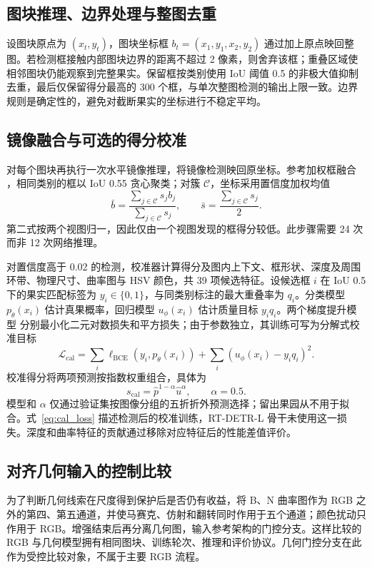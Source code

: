\documentclass[11pt,a4paper]{ctexart}
\begin{document}
\subsection{图块推理、边界处理与整图去重}
设图块原点为 $(x_t,y_t)$，图块坐标框 $b_t=(x_1,y_1,x_2,y_2)$ 通过加上原点映回整图。若检测框接触内部图块边界的距离不超过 2 像素，则舍弃该框；重叠区域使相邻图块仍能观察到完整果实。保留框按类别使用 IoU 阈值 0.5 的非极大值抑制去重，最后仅保留得分最高的 300 个框，与单次整图检测的输出上限一致。边界规则是确定性的，避免对截断果实的坐标进行不稳定平均。

\subsection{镜像融合与可选的得分校准}
对每个图块再执行一次水平镜像推理，将镜像检测映回原坐标。参考加权框融合 \cite{wbf}，相同类别的框以 IoU 0.55 贪心聚类；对簇 $\mathcal{C}$，坐标采用置信度加权均值
\begin{equation}
\bar b=\frac{\sum_{j\in\mathcal{C}}s_j b_j}{\sum_{j\in\mathcal{C}}s_j},
\qquad
\bar s=\frac{\sum_{j\in\mathcal{C}}s_j}{2}.
\end{equation}
第二式按两个视图归一，因此仅由一个视图发现的框得分较低。此步骤需要 24 次而非 12 次网络推理。

对置信度高于 0.02 的检测，校准器计算得分及图内上下文、框形状、深度及周围环带、物理尺寸、曲率图与 HSV 颜色，共 39 项候选特征。设候选框 $i$ 在 IoU 0.5 下的果实匹配标签为 $y_i\in\{0,1\}$，与同类别标注的最大重叠率为 $q_i$。分类模型 $p_\theta(x_i)$ 估计真果概率，回归模型 $u_\phi(x_i)$ 估计质量目标 $y_iq_i$。两个梯度提升模型 \cite{lgbm} 分别最小化二元对数损失和平方损失；由于参数独立，其训练可写为分解式校准目标
\begin{equation}
\mathcal{L}_{\mathrm{cal}}=\sum_i\ell_{\mathrm{BCE}}\!\left(y_i,p_\theta(x_i)\right)
+\sum_i\left(u_\phi(x_i)-y_iq_i\right)^2.
\label{eq:cal_loss}
\end{equation}
校准得分将两项预测按指数权重组合，具体为
\begin{equation}
s_{\mathrm{cal}}=\hat p^{1-\alpha}\hat u^{\alpha},\qquad \alpha=0.5.
\end{equation}
模型和 $\alpha$ 仅通过验证集按图像分组的五折折外预测选择；留出果园从不用于拟合。式~\eqref{eq:cal_loss} 描述检测后的校准训练，RT-DETR-L 骨干未使用这一损失。深度和曲率特征的贡献通过移除对应特征后的性能差值评价。

\subsection{对齐几何输入的控制比较}
为了判断几何线索在尺度得到保护后是否仍有收益，将 B、N 曲率图作为 RGB 之外的第四、第五通道，并使马赛克、仿射和翻转同时作用于五个通道；颜色扰动只作用于 RGB。增强结束后再分离几何图，输入参考架构的门控分支。这样比较的 RGB 与几何模型拥有相同图块、训练轮次、推理和评价协议。几何门控分支在此作为受控比较对象，不属于主要 RGB 流程。
\end{document}
